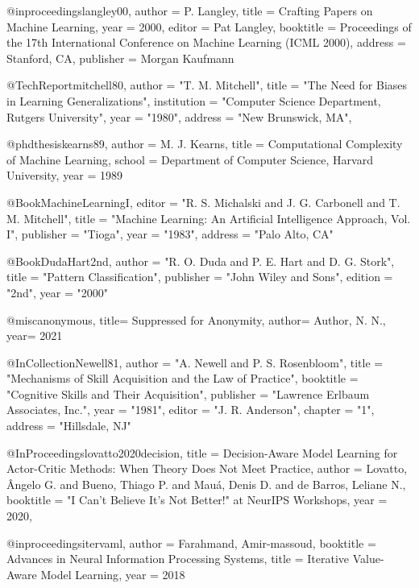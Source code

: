 @inproceedings{langley00,
 author    = {P. Langley},
 title     = {Crafting Papers on Machine Learning},
 year      = {2000},
 editor    = {Pat Langley},
 booktitle     = {Proceedings of the 17th International Conference
              on Machine Learning (ICML 2000)},
 address   = {Stanford, CA},
 publisher = {Morgan Kaufmann}
}

@TechReport{mitchell80,
  author = 	 "T. M. Mitchell",
  title = 	 "The Need for Biases in Learning Generalizations",
  institution =  "Computer Science Department, Rutgers University",
  year = 	 "1980",
  address =	 "New Brunswick, MA",
}

@phdthesis{kearns89,
  author = {M. J. Kearns},
  title =  {Computational Complexity of Machine Learning},
  school = {Department of Computer Science, Harvard University},
  year =   {1989}
}

@Book{MachineLearningI,
  editor = 	 "R. S. Michalski and J. G. Carbonell and T.
		  M. Mitchell",
  title = 	 "Machine Learning: An Artificial Intelligence
		  Approach, Vol. I",
  publisher = 	 "Tioga",
  year = 	 "1983",
  address =	 "Palo Alto, CA"
}

@Book{DudaHart2nd,
  author =       "R. O. Duda and P. E. Hart and D. G. Stork",
  title =        "Pattern Classification",
  publisher =    "John Wiley and Sons",
  edition =      "2nd",
  year =         "2000"
}

@misc{anonymous,
  title= {Suppressed for Anonymity},
  author= {Author, N. N.},
  year= {2021}
}

@InCollection{Newell81,
  author =       "A. Newell and P. S. Rosenbloom",
  title =        "Mechanisms of Skill Acquisition and the Law of
                  Practice", 
  booktitle =    "Cognitive Skills and Their Acquisition",
  publisher =    "Lawrence Erlbaum Associates, Inc.",
  year =         "1981",
  editor =       "J. R. Anderson",
  chapter =      "1",
  address =      "Hillsdale, NJ"
}


@InProceedings{lovatto2020decision,
  title = 	 {Decision-Aware Model Learning for Actor-Critic Methods: When Theory Does Not Meet Practice},
  author =       {Lovatto, \^{A}ngelo G. and Bueno, Thiago P. and Mau\'{a}, Denis D. and de Barros, Leliane N.},
  booktitle = 	 {"I Can't Believe It's Not Better!" at NeurIPS Workshops},
  year = 	 {2020},
}

@inproceedings{itervaml,
 author = {Farahmand, Amir-massoud},
 booktitle = {Advances in Neural Information Processing Systems},
 title = {Iterative Value-Aware Model Learning},
 year = {2018}
}


